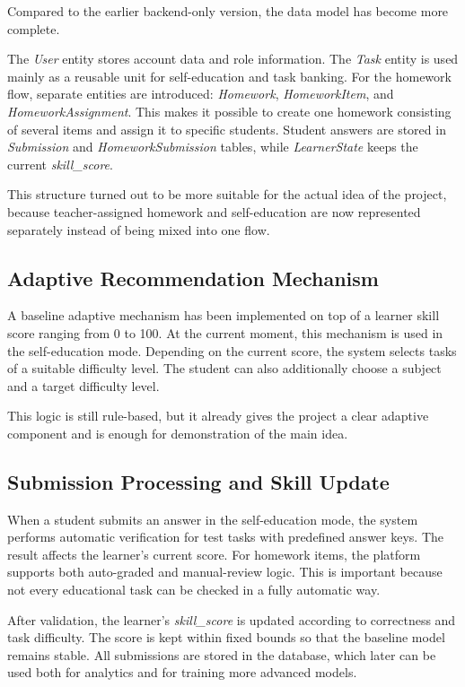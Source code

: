 \documentclass[a4paper,12pt]{extarticle}
\begin{document}
Compared to the earlier backend-only version, the data model has become more complete.

The \textit{User} entity stores account data and role information. The \textit{Task} entity is used mainly as a reusable unit for self-education and task banking. For the homework flow, separate entities are introduced: \textit{Homework}, \textit{HomeworkItem}, and \textit{HomeworkAssignment}. This makes it possible to create one homework consisting of several items and assign it to specific students. Student answers are stored in \textit{Submission} and \textit{HomeworkSubmission} tables, while \textit{LearnerState} keeps the current \textit{skill\_score}.

This structure turned out to be more suitable for the actual idea of the project, because teacher-assigned homework and self-education are now represented separately instead of being mixed into one flow.

\subsection{Adaptive Recommendation Mechanism}

A baseline adaptive mechanism has been implemented on top of a learner skill score ranging from 0 to 100. At the current moment, this mechanism is used in the self-education mode. Depending on the current score, the system selects tasks of a suitable difficulty level. The student can also additionally choose a subject and a target difficulty level.

This logic is still rule-based, but it already gives the project a clear adaptive component and is enough for demonstration of the main idea.

\subsection{Submission Processing and Skill Update}

When a student submits an answer in the self-education mode, the system performs automatic verification for test tasks with predefined answer keys. The result affects the learner's current score. For homework items, the platform supports both auto-graded and manual-review logic. This is important because not every educational task can be checked in a fully automatic way.

After validation, the learner's \textit{skill\_score} is updated according to correctness and task difficulty. The score is kept within fixed bounds so that the baseline model remains stable. All submissions are stored in the database, which later can be used both for analytics and for training more advanced models.
\end{document}
